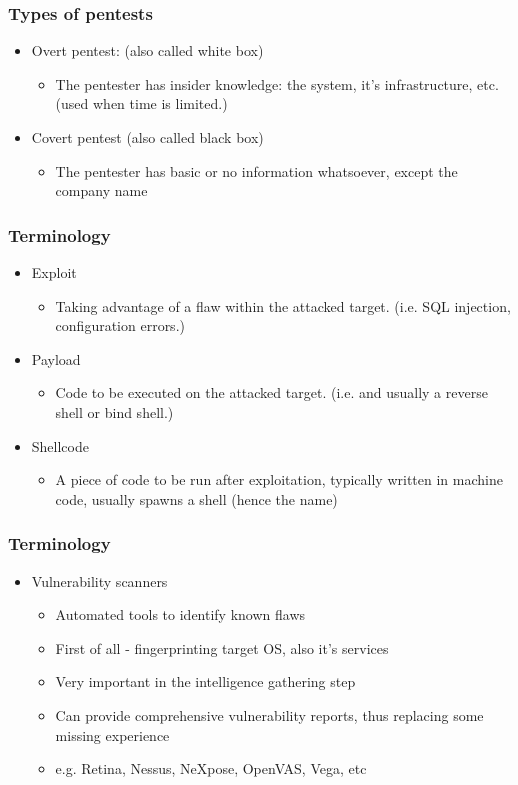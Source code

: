 \documentclass{beamer}
\begin{document}
\begin{frame}
	\frametitle{Types of pentests}
	\begin{itemize} \itemsep8ex
	\item<2-> Overt pentest: (also called white box)
		\begin{itemize}
		\item<3-> The pentester has insider knowledge: the system, it’s infrastructure, etc. (used when time is limited.)
		\end{itemize}

	\item<4-> Covert pentest (also called black box)
		\begin{itemize}
		\item<5-> The pentester has basic or no information whatsoever, except the company name
		\end{itemize}
	\end{itemize}
\end{frame}

\begin{frame}
	\frametitle{Terminology}
	\begin{itemize} \itemsep4ex 
	\item<2-> Exploit 
		\begin{itemize} 
		\item Taking advantage of a flaw within the attacked target. (i.e. SQL injection, configuration errors.)
		\end{itemize}
	\item<3-> Payload
		\begin{itemize} 
		\item Code to be executed on the attacked target. (i.e. and usually a reverse shell or bind shell.)
		\end{itemize}
	\item<4-> Shellcode
		\begin{itemize} 
		\item A piece of code to be run after exploitation, typically written in machine code, usually spawns a shell (hence the name)
		\end{itemize}
	\end{itemize}
\end{frame}

\begin{frame}
	\frametitle{Terminology}
	\begin{itemize}
	\item Vulnerability scanners
		\begin{itemize} \itemsep3ex
			\item<2-> Automated tools to identify known flaws
			\item<3-> First of all - fingerprinting target OS, also it’s services
			\item<4-> Very important in the intelligence gathering step
			\item<5-> Can provide comprehensive vulnerability reports, thus replacing some missing experience
			\item<6> e.g. Retina, Nessus, NeXpose, OpenVAS, Vega, etc
		\end{itemize}
	\end{itemize}
\end{frame}
\end{document}
